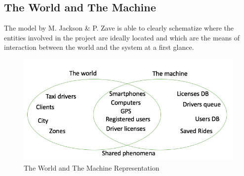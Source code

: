 \documentclass[a4paper]{article}
\begin{document}
\subsection{The World and The Machine}The model by M. Jackson \& P. Zave is able to clearly schematize where the entities involved in the project are ideally located and which are the means of interaction between the world and the system at a first glance.

\begin{figure}[H]
\includegraphics[width=.8\textwidth]{WorldAndMachine}
\centering
\caption{The World and The Machine Representation}
\end{figure}
\end{document}
